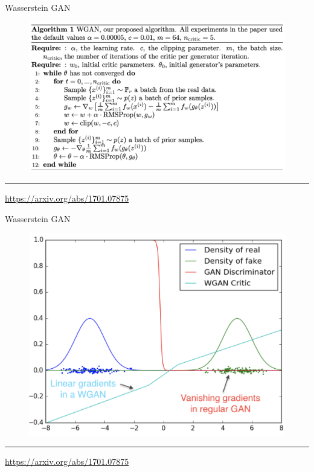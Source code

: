 \begin{frame}{Wasserstein GAN}
	\begin{figure}
		\centering
		\includegraphics[width=1.0\linewidth]{figs/wgan_pseudocode}
	\end{figure}
	\vfill
	\hrule\medskip 
	{\scriptsize \href{https://arxiv.org/abs/1701.07875}{https://arxiv.org/abs/1701.07875}}
\end{frame}
\begin{frame}{Wasserstein GAN}
	\begin{figure}
		\centering
		\includegraphics[width=0.8\linewidth]{figs/wgan_toy}
	\end{figure}
	\vfill
	\hrule\medskip 
	{\scriptsize \href{https://arxiv.org/abs/1701.07875}{https://arxiv.org/abs/1701.07875}}
\end{frame}
